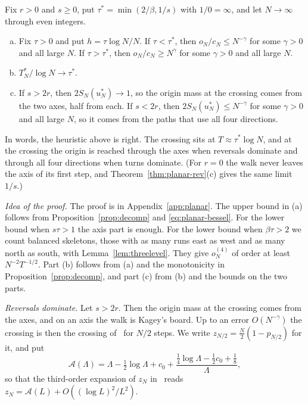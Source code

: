 \begin{theorem}\label{thm:planar-first}
Fix $r>0$ and $s\ge0$, put $\tau^*=\min(2/\beta,1/s)$ with $1/0=\infty$, and let $N\to\infty$
through even integers.
\begin{enumerate}[(a)]
\item Fix $\tau>0$ and put $h=\tau\log N/N$. If $\tau<\tau^*$, then $o_N/c_N\le N^{-\gamma}$ for
some $\gamma>0$ and all large $N$. If $\tau>\tau^*$, then $o_N/c_N\ge N^{\gamma}$ for some
$\gamma>0$ and all large $N$.
\item $T^*_N/\log N\to\tau^*$.
\item If $s>2r$, then $2S_N(u^*_N)\to1$, so the origin mass at the crossing comes from the two axes,
half from each. If $s<2r$, then $2S_N(u^*_N)\le N^{-\gamma}$ for some $\gamma>0$ and all large $N$,
so it comes from the paths that use all four directions.
\end{enumerate}
\end{theorem}

In words, the heuristic above is right. The crossing sits at $T\approx\tau^*\log
N$, and at the crossing the origin is reached through the axes when reversals
dominate and through all four directions when turns dominate. (For $r=0$ the
walk never leaves the axis of its first step, and Theorem~\ref{thm:planar-rev}(c)
gives the same limit $1/s$.)

\emph{Idea of the proof.} The proof is in Appendix~\ref{app:planar}. The upper
bound in (a) follows from Proposition~\ref{prop:decomp} and
\eqref{eq:planar-bessel}. For the lower bound when $s\tau>1$ the axis part is
enough. For the lower bound when $\beta\tau>2$ we count balanced skeletons, those
with as many runs east as west and as many north as south, with
Lemma~\ref{lem:threelevel}. They give $o^{(4)}_N$ of order at least
$N^{-2}T^{-1/2}$. Part (b) follows from (a) and the monotonicity in
Proposition~\ref{prop:decomp}, and part (c) from (b) and the bounds on the two
parts.

\emph{Reversals dominate.} Let $s>2r$. Then the origin mass at the crossing
comes from the axes, and on an axis the walk is Kagey's board. Up to an error
$O(N^{-\gamma})$ the crossing
is then the crossing of~\cite{paperA} for $N/2$ steps. We write
$z_{N/2}=\frac N2(1-p_{N/2})$ for it, and put
\[
 \mathcal A(\Lambda)=\Lambda-\tfrac12\log\Lambda+c_0
 +\frac{\frac14\log\Lambda-\frac12c_0+\frac18}{\Lambda},
\]
so that the third-order expansion of $z_N$ in~\cite[Corollary~3.7(c)]{paperA} reads
$z_N=\mathcal A(L)+O((\log L)^2/L^2)$.

